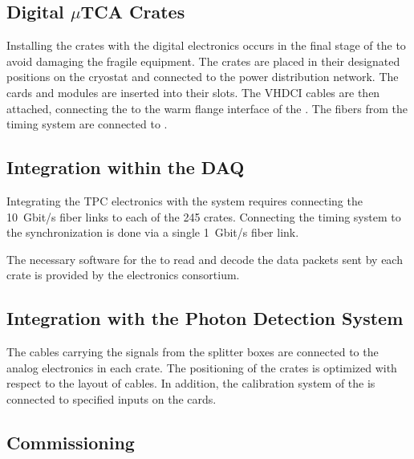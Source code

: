 \subsection{Digital $\mu$TCA Crates}
\label{ssec:dp-tpcelec-install-utca}

Installing the  crates with the digital electronics occurs in the final stage of the  to avoid damaging the fragile equipment. The crates are placed in their designated positions on the cryostat and connected to the power distribution network. The  cards and  modules are inserted into their slots. The VHDCI cables are then attached, connecting the   to the warm flange interface of the .  The fibers from the timing system are connected to . 

\subsection{Integration within the DAQ}
\label{ssec:dp-tpcelec-install-daq}

Integrating the \dual TPC electronics with the  system requires connecting the \SI{10}{Gbit/s} fiber links to each of the \num{245}  crates. Connecting the timing system to the synchronization  is done via a single \SI{1}{Gbit/s} fiber link. 

The necessary software for the  to read and decode the data packets sent by each  crate is provided by the electronics consortium.  

\subsection{Integration with the Photon Detection System}
\label{ssec:dp-tpcelec-install-pmt}

The cables carrying the  signals from the splitter boxes are connected to the  analog electronics in each  crate. The positioning of the crates is optimized with respect to the layout of  cables. In addition, the calibration system of the  is connected to specified inputs on the cards.


\subsection{Commissioning}
\label{ssec:dp-tpcelec-install-comission}

